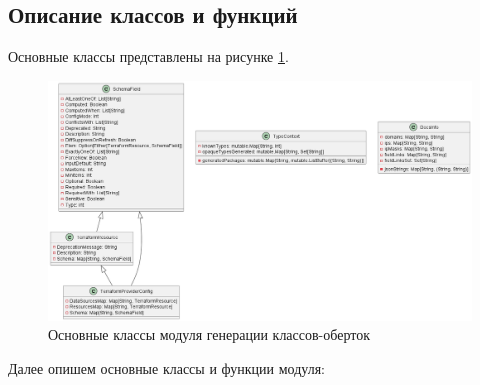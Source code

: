 \subsection{Описание классов и функций}

Основные классы представлены на рисунке \ref{fig:uml1}.

\begin{figure}[h]
  \centering
  \includegraphics[scale=0.35]{img/5.png}
  \caption{Основные классы модуля генерации классов-оберток}
  \label{fig:uml1}
\end{figure}

\vspace{60mm}

Далее опишем основные классы и функции модуля:

